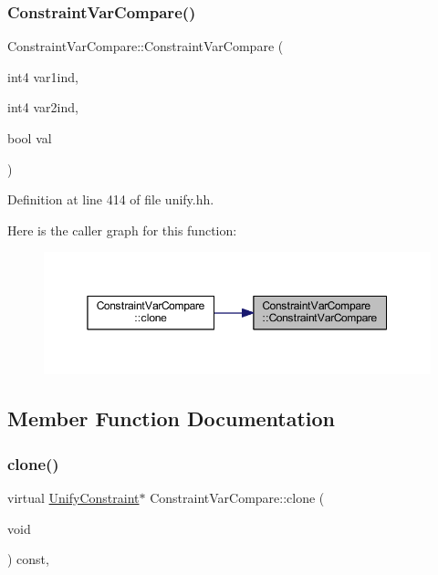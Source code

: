 \subsubsection{\texorpdfstring{ConstraintVarCompare()}{ConstraintVarCompare()}}
{\footnotesize\ttfamily Constraint\+Var\+Compare\+::\+Constraint\+Var\+Compare (\begin{DoxyParamCaption}\item[{int4}]{var1ind,  }\item[{int4}]{var2ind,  }\item[{bool}]{val }\end{DoxyParamCaption})\hspace{0.3cm}{\ttfamily [inline]}}



Definition at line 414 of file unify.\+hh.

Here is the caller graph for this function\+:
\nopagebreak
\begin{figure}[H]
\begin{center}
\leavevmode
\includegraphics[width=350pt]{class_constraint_var_compare_af7d5ed5a49936f51e8bc2402723d29b5_icgraph}
\end{center}
\end{figure}


\subsection{Member Function Documentation}
\mbox{\label{class_constraint_var_compare_adc69772066381dd17190c552d5efe0d5}} 
\subsubsection{\texorpdfstring{clone()}{clone()}}
{\footnotesize\ttfamily virtual \mbox{\hyperlink{class_unify_constraint}{Unify\+Constraint}}$\ast$ Constraint\+Var\+Compare\+::clone (\begin{DoxyParamCaption}\item[{void}]{ }\end{DoxyParamCaption}) const\hspace{0.3cm}{\ttfamily [inline]}, {\ttfamily [virtual]}}



